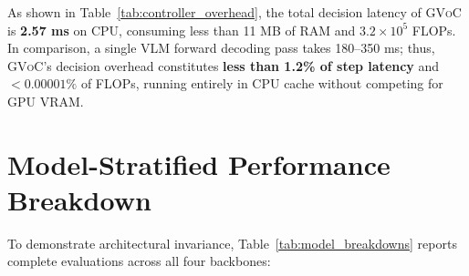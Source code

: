 \documentclass[11pt]{article}
\begin{document}
As shown in Table~\ref{tab:controller_overhead}, the total decision latency of \textsc{GVoC} is \textbf{2.57 ms} on CPU, consuming less than 11 MB of RAM and $3.2 \times 10^5$ FLOPs. In comparison, a single VLM forward decoding pass takes 180--350 ms; thus, \textsc{GVoC}'s decision overhead constitutes \textbf{less than 1.2\% of step latency} and $< 0.00001\%$ of FLOPs, running entirely in CPU cache without competing for GPU VRAM.

\section{Model-Stratified Performance Breakdown}
\label{app:models}

To demonstrate architectural invariance, Table~\ref{tab:model_breakdowns} reports complete evaluations across all four backbones:
\end{document}
